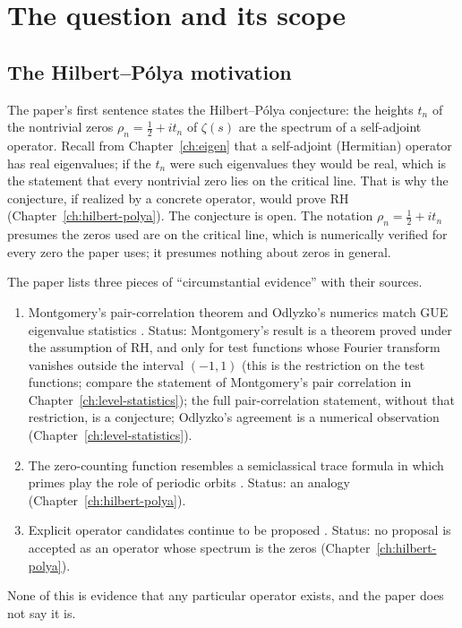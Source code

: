 \section{The question and its scope}\label{sec:paper-setup-question}

\subsection{The Hilbert--P\'olya motivation}

The paper's first sentence states the Hilbert--P\'olya conjecture: the heights $t_n$ of the nontrivial zeros $\rho_n=\tfrac12+it_n$ of $\zeta(s)$ are the spectrum of a self-adjoint operator. Recall from Chapter~\ref{ch:eigen} that a self-adjoint (Hermitian) operator has real eigenvalues; if the $t_n$ were such eigenvalues they would be real, which is the statement that every nontrivial zero lies on the critical line. That is why the conjecture, if realized by a concrete operator, would prove RH (Chapter~\ref{ch:hilbert-polya}). The conjecture is open. The notation $\rho_n=\tfrac12+it_n$ presumes the zeros used are on the critical line, which is numerically verified for every zero the paper uses; it presumes nothing about zeros in general.

The paper lists three pieces of ``circumstantial evidence'' with their sources.
\begin{enumerate}
\item Montgomery's pair-correlation theorem and Odlyzko's numerics match GUE eigenvalue statistics \cite{montgomery,odlyzko87}. Status: Montgomery's result is a theorem proved under the assumption of RH, and only for test functions whose Fourier transform vanishes outside the interval $(-1,1)$ (this is the restriction on the test functions; compare the statement of Montgomery's pair correlation in Chapter~\ref{ch:level-statistics}); the full pair-correlation statement, without that restriction, is a conjecture; Odlyzko's agreement is a numerical observation (Chapter~\ref{ch:level-statistics}).
\item The zero-counting function resembles a semiclassical trace formula in which primes play the role of periodic orbits \cite{berrykeating99,schumayer}. Status: an analogy (Chapter~\ref{ch:hilbert-polya}).
\item Explicit operator candidates continue to be proposed \cite{connes,bbm,bellissard,sierra,recenthp1,recenthp2,zetatriples}. Status: no proposal is accepted as an operator whose spectrum is the zeros (Chapter~\ref{ch:hilbert-polya}).
\end{enumerate}
None of this is evidence that any particular operator exists, and the paper does not say it is.

